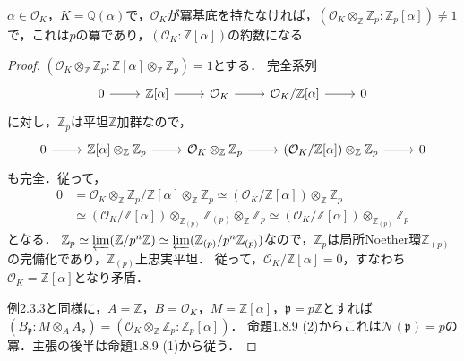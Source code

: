 \begin{screen}
  $\alpha\in\mathcal{O}_K$，$K=\mathbb{Q}(\alpha)$で，$\mathcal{O}_K$が冪基底を持たなければ，$(\mathcal{O}_K\otimes_\mathbb{Z}\mathbb{Z}_p:\mathbb{Z}_p[\alpha])\neq1$で，これは$p$の冪であり，$(\mathcal{O}_K:\mathbb{Z}[\alpha])$の約数になる
\end{screen}
\begin{proof}
  $(\mathcal{O}_K\otimes_\mathbb{Z}\mathbb{Z}_p:\mathbb{Z}[\alpha] \otimes_\mathbb{Z} \mathbb{Z}_p) = 1$とする．
  完全系列
  \[
  \begin{tikzcd}
    0 \arrow[r] & \mathbb{Z}[\alpha] \arrow[r] & \mathcal{O}_K \arrow[r] & \mathcal{O}_K/\mathbb{Z}[\alpha] \arrow[r] & 0
  \end{tikzcd}
  \]
  に対し，$\mathbb{Z}_p$は平坦$\mathbb{Z}$加群なので，
  \[
  \begin{tikzcd}
    0 \arrow[r] & \mathbb{Z}[\alpha] \otimes_\mathbb{Z} \mathbb{Z}_p \arrow[r] & \mathcal{O}_K \otimes_\mathbb{Z} \mathbb{Z}_p \arrow[r] & (\mathcal{O}_K/\mathbb{Z}[\alpha]) \otimes_\mathbb{Z} \mathbb{Z}_p \arrow[r] & 0
  \end{tikzcd}
  \]
  も完全．従って，
  \begin{align*}
    0 &= \mathcal{O}_K \otimes_\mathbb{Z} \mathbb{Z}_p / \mathbb{Z}[\alpha] \otimes_\mathbb{Z} \mathbb{Z}_p \simeq (\mathcal{O}_K/\mathbb{Z}[\alpha]) \otimes_\mathbb{Z} \mathbb{Z}_p \\
    &\simeq (\mathcal{O}_K/\mathbb{Z}[\alpha]) \otimes_{\mathbb{Z}_{(p)}} \mathbb{Z}_{(p)} \otimes_\mathbb{Z} \mathbb{Z}_p \simeq (\mathcal{O}_K/\mathbb{Z}[\alpha]) \otimes_{\mathbb{Z}_{(p)}} \mathbb{Z}_p
  \end{align*}
  となる．
  $\mathbb{Z}_p \simeq \varprojlim (\mathbb{Z}/p^n\mathbb{Z}) \simeq \varprojlim (\mathbb{Z}_{(p)}/p^n\mathbb{Z}_{(p)})$なので，$\mathbb{Z}_p$は局所Noether環$\mathbb{Z}_{(p)}$の完備化であり，$\mathbb{Z}_{(p)}$上忠実平坦．
  従って，$\mathcal{O}_K/\mathbb{Z}[\alpha] = 0$，すなわち$\mathcal{O}_K = \mathbb{Z}[\alpha]$となり矛盾．

  例2.3.3と同様に，$A=\mathbb{Z}$，$B=\mathcal{O}_K$，$M=\mathbb{Z}[\alpha]$，$\mathfrak{p}=p\mathbb{Z}$とすれば
  $(B_\mathfrak{p}:M\otimes_AA_\mathfrak{p})=(\mathcal{O}_K\otimes_\mathbb{Z}\mathbb{Z}_p:\mathbb{Z}_p[\alpha])$．
  命題1.8.9 (2)からこれは$\mathcal{N}(\mathfrak{p})=p$の冪．主張の後半は命題1.8.9 (1)から従う．
\end{proof}

